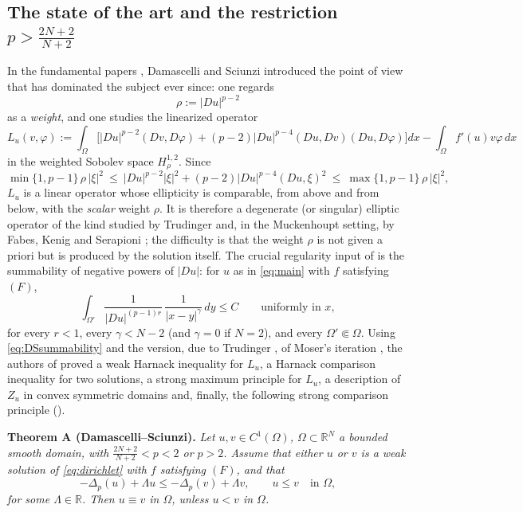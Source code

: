 \documentclass[reqno]{amsart}
\theoremstyle{plain}
\theoremstyle{definition}
\theoremstyle{remark}
\newcommand{\R}{\mathbb{R}}
\newcommand{\Lap}[1]{\Delta_{#1}}
\begin{document}
\subsection{The state of the art and the restriction \texorpdfstring{$p>\frac{2N+2}{N+2}$}{p>(2N+2)/(N+2)}}
In the fundamental papers \cite{DS1,DS2}, Damascelli and Sciunzi introduced the point of view that
has dominated the subject ever since: one regards
\begin{equation}\label{eq:rho}
\rho:=|Du|^{p-2}
\end{equation}
as a \emph{weight}, and one studies the linearized operator
\begin{equation}\label{eq:linearized}
L_u(v,\varphi):=\int_\Omega\Big[|Du|^{p-2}(Dv,D\varphi)+(p-2)|Du|^{p-4}(Du,Dv)(Du,D\varphi)\Big]dx
-\int_\Omega f'(u)v\varphi\,dx
\end{equation}
in the weighted Sobolev space $H^{1,2}_{\rho}$. Since
\begin{equation}\label{eq:ellipticity}
\min\{1,p-1\}\,\rho\,|\xi|^2\ \le\ |Du|^{p-2}|\xi|^2+(p-2)|Du|^{p-4}(Du,\xi)^2\ \le\ \max\{1,p-1\}\,\rho\,|\xi|^2 ,
\end{equation}
$L_u$ is a linear operator whose ellipticity is comparable, from above and from below, with the
\emph{scalar} weight $\rho$. It is therefore a degenerate (or singular) elliptic operator of the kind
studied by Trudinger \cite{Tru1} and, in the Muckenhoupt setting, by Fabes, Kenig and Serapioni
\cite{FKS}; the difficulty is that the weight $\rho$ is not given a priori but is produced by the
solution itself. The crucial regularity input of \cite{DS1} is the summability of
negative powers of $|Du|$: for $u$ as in \eqref{eq:main} with $f$ satisfying $(F)$,
\begin{equation}\label{eq:DSsummability}
\int_{\Omega'}\frac{1}{|Du|^{(p-1)r}}\,\frac{1}{|x-y|^{\gamma}}\,dy\le C\qquad
\text{uniformly in }x ,
\end{equation}
for every $r<1$, every $\gamma<N-2$ (and $\gamma=0$ if $N=2$), and every $\Omega'\Subset\Omega$.
Using \eqref{eq:DSsummability} and the version, due to Trudinger \cite{Tru2}, of Moser's iteration
\cite{Moser}, the authors
of \cite{DS2} proved a weak Harnack inequality for $L_u$, a Harnack comparison inequality for two
solutions, a strong maximum principle for $L_u$, a description of $Z_u$ in convex symmetric domains
and, finally, the following strong comparison principle
(\cite[Theorem 1.4]{DS2}).

\medskip
\noindent\textbf{Theorem A (Damascelli--Sciunzi).}
\emph{Let $u,v\in C^1(\Omega)$, $\Omega\subset\R^N$ a bounded smooth domain, with
$\frac{2N+2}{N+2}<p<2$ or $p>2$. Assume that either $u$ or $v$ is a weak solution of
\eqref{eq:dirichlet} with $f$ satisfying $(F)$, and that}
\[
-\Lap{p}(u)+\Lambda u\le-\Lap{p}(v)+\Lambda v,\qquad u\le v \quad\text{in }\Omega ,
\]
\emph{for some $\Lambda\in\R$. Then $u\equiv v$ in $\Omega$, unless $u<v$ in $\Omega$.}
\medskip
\end{document}
